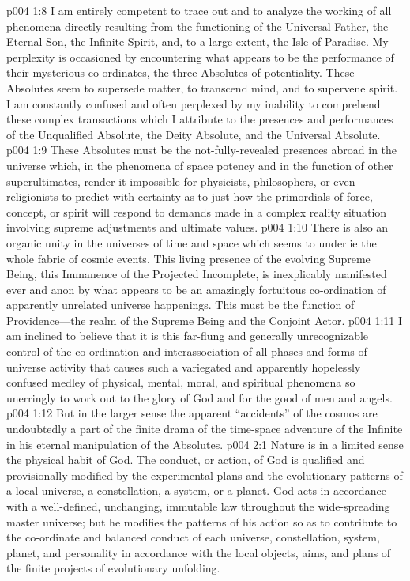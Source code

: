 \vs p004 1:8 I am entirely competent to trace out and to analyze the working of all phenomena directly resulting from the functioning of the Universal Father, the Eternal Son, the Infinite Spirit, and, to a large extent, the Isle of Paradise. My perplexity is occasioned by encountering what appears to be the performance of their mysterious co\hyp{}ordinates, the three Absolutes of potentiality. These Absolutes seem to supersede matter, to transcend mind, and to supervene spirit. I am constantly confused and often perplexed by my inability to comprehend these complex transactions which I attribute to the presences and performances of the Unqualified Absolute, the Deity Absolute, and the Universal Absolute.
\vs p004 1:9 These Absolutes must be the not\hyp{}fully\hyp{}revealed presences abroad in the universe which, in the phenomena of space potency and in the function of other superultimates, render it impossible for physicists, philosophers, or even religionists to predict with certainty as to just how the primordials of force, concept, or spirit will respond to demands made in a complex reality situation involving supreme adjustments and ultimate values.
\pc \vs p004 1:10 There is also an organic unity in the universes of time and space which seems to underlie the whole fabric of cosmic events. This living presence of the evolving Supreme Being, this Immanence of the Projected Incomplete, is inexplicably manifested ever and anon by what appears to be an amazingly fortuitous co\hyp{}ordination of apparently unrelated universe happenings. This must be the function of Providence---the realm of the Supreme Being and the Conjoint Actor.
\vs p004 1:11 I am inclined to believe that it is this far\hyp{}flung and generally unrecognizable control of the co\hyp{}ordination and interassociation of all phases and forms of universe activity that causes such a variegated and apparently hopelessly confused medley of physical, mental, moral, and spiritual phenomena so unerringly to work out to the glory of God and for the good of men and angels.
\vs p004 1:12 But in the larger sense the apparent “accidents” of the cosmos are undoubtedly a part of the finite drama of the time\hyp{}space adventure of the Infinite in his eternal manipulation of the Absolutes.
\vs p004 2:1 Nature is in a limited sense the physical habit of God. The conduct, or action, of God is qualified and provisionally modified by the experimental plans and the evolutionary patterns of a local universe, a constellation, a system, or a planet. God acts in accordance with a well\hyp{}defined, unchanging, immutable law throughout the wide\hyp{}spreading master universe; but he modifies the patterns of his action so as to contribute to the co\hyp{}ordinate and balanced conduct of each universe, constellation, system, planet, and personality in accordance with the local objects, aims, and plans of the finite projects of evolutionary unfolding.
